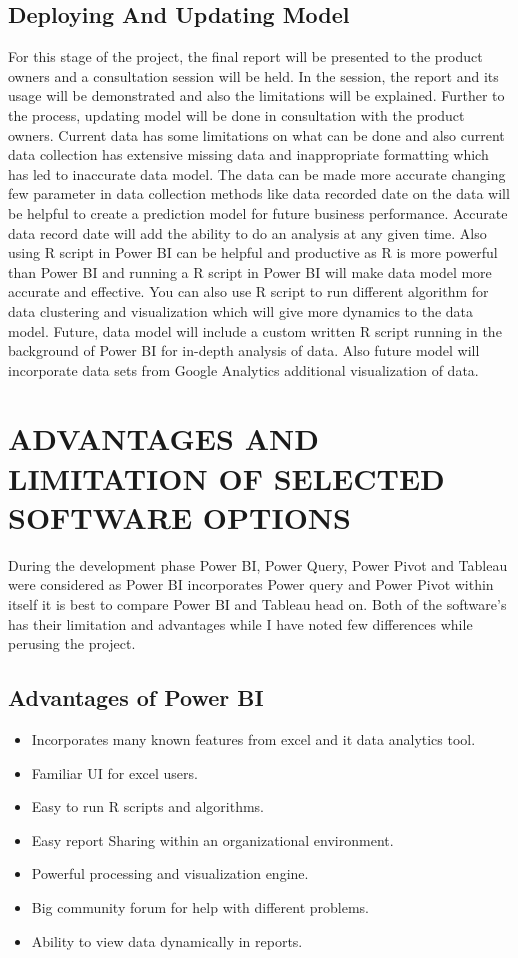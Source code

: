 \documentclass{article}
\begin{document}
\subsection{Deploying And Updating Model}\label{deploying}
For this stage of the project, the final report will be presented to the product owners and a consultation session will be held. In the session, the report and its usage will be demonstrated and also the limitations will be explained. Further to the process, updating model will be done in consultation with the product owners. Current data has some limitations on what can be done and also current data collection has extensive missing data and inappropriate formatting which has led to inaccurate data model. The data can be made more accurate changing few parameter in data collection methods like data recorded date on the data will be helpful to create a prediction model for future business performance. Accurate data record date will add the ability to do an analysis at any given time. Also using R script in Power BI can be helpful and productive as R is more powerful than Power BI and running a R script in Power BI will make data model more accurate and effective. You can also use R script to run different algorithm for data clustering and visualization which will give more dynamics to the data model. Future, data model will include a custom written R script running in the background of Power BI for in-depth analysis of data. Also future model will incorporate data sets from Google Analytics additional visualization of data.\pagebreak

\section{ADVANTAGES AND LIMITATION OF SELECTED SOFTWARE OPTIONS }\label{sec:SOFTWARE OPTIONS}
During the development phase Power BI, Power Query, Power Pivot and Tableau were considered as Power BI incorporates Power query and Power Pivot within itself it is best to compare Power BI and Tableau head on. Both of the software’s has their limitation and advantages while I have noted few differences while perusing the project. 
\subsection{Advantages of Power BI }\label{advantages}
\begin{itemize}
\item Incorporates many known features from excel and it data analytics tool.
\item Familiar UI for excel users.
\item Easy to run R scripts and algorithms.
\item Easy report Sharing within an organizational environment. 
\item Powerful processing and visualization engine.
\item Big community forum for help with different problems.
\item Ability to view data dynamically in reports.
\end{itemize}
\end{document}
